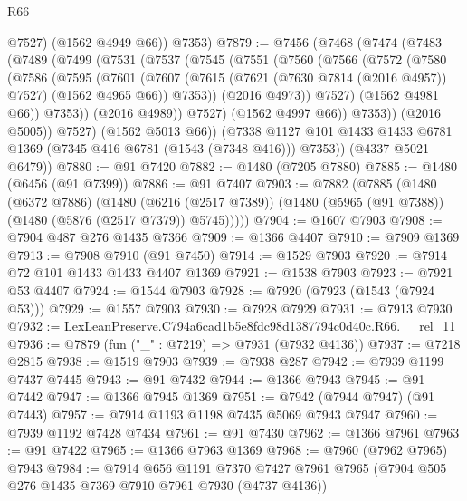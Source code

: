 \begin{lexlean}{R66}
\begin{coremodule}
          @7527)
        (@1562 @4949 @66))
      @7353)
@7879 := @7456
    (@7468
      (@7474
        (@7483
          (@7489
            (@7499
              (@7531
                (@7537
                  (@7545
                    (@7551
                      (@7560
                        (@7566
                          (@7572
                            (@7580
                              (@7586
                                (@7595
                                  (@7601
                                    (@7607
                                      (@7615
                                        (@7621 (@7630 @7814 (@2016 @4957)) @7527)
                                        (@1562 @4965 @66))
                                      @7353))
                                  (@2016 @4973))
                                @7527)
                              (@1562 @4981 @66))
                            @7353))
                        (@2016 @4989))
                      @7527)
                    (@1562 @4997 @66))
                  @7353))
              (@2016 @5005))
            @7527)
          (@1562 @5013 @66))
        (@7338 @1127 @101 @1433 @1433 @6781 @1369 (@7345 @416 @6781 (@1543 (@7348 @416))) @7353))
      (@4337 @5021 @6479))
@7880 := @91 @7420
@7882 := @1480 (@7205 @7880)
@7885 := @1480 (@6456 (@91 @7399))
@7886 := @91 @7407
@7903 := @7882
    (@7885
      (@1480
        (@6372 @7886)
        (@1480
          (@6216 (@2517 @7389))
          (@1480 (@5965 (@91 @7388)) (@1480 (@5876 (@2517 @7379)) @5745)))))
@7904 := @1607 @7903
@7908 := @7904 @487 @276 @1435 @7366
@7909 := @1366 @4407
@7910 := @7909 @1369
@7913 := @7908 @7910 (@91 @7450)
@7914 := @1529 @7903
@7920 := @7914 @72 @101 @1433 @1433 @4407 @1369
@7921 := @1538 @7903
@7923 := @7921 @53 @4407
@7924 := @1544 @7903
@7928 := @7920 (@7923 (@1543 (@7924 @53)))
@7929 := @1557 @7903
@7930 := @7928 @7929
@7931 := @7913 @7930
@7932 := LexLeanPreserve.C794a6cad1b5e8fdc98d1387794c0d40c.R66.__rel_11
@7936 := @7879 (fun ("_" : @7219) => @7931 (@7932 @4136))
@7937 := @7218 @2815
@7938 := @1519 @7903
@7939 := @7938 @287
@7942 := @7939 @1199 @7437 @7445
@7943 := @91 @7432
@7944 := @1366 @7943
@7945 := @91 @7442
@7947 := @1366 @7945 @1369
@7951 := @7942 (@7944 @7947) (@91 @7443)
@7957 := @7914 @1193 @1198 @7435 @5069 @7943 @7947
@7960 := @7939 @1192 @7428 @7434
@7961 := @91 @7430
@7962 := @1366 @7961
@7963 := @91 @7422
@7965 := @1366 @7963 @1369
@7968 := @7960 (@7962 @7965) @7943
@7984 := @7914
    @656
    @1191
    @7370
    @7427
    @7961
    @7965
    (@7904 @505 @276 @1435 @7369 @7910 @7961 @7930 (@4737 @4136))

\end{coremodule}
\end{lexlean}
